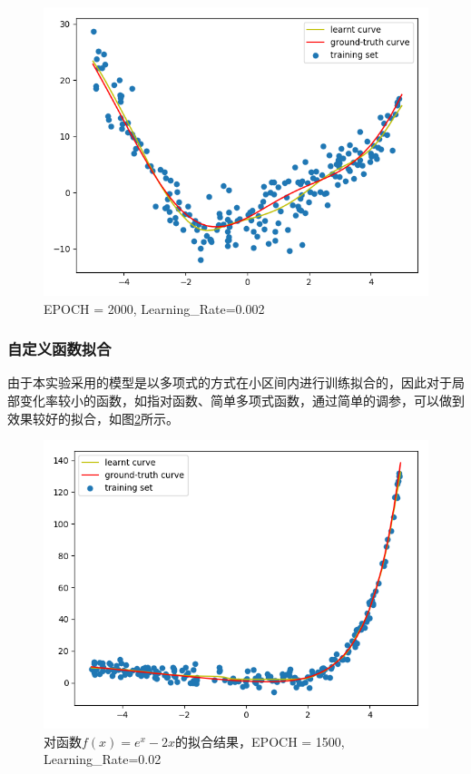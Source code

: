 \documentclass{article}
\begin{document}
\begin{figure}[htb]
\centering
\includegraphics[width=13.5cm]{img/plot2000_002.png}
\caption{EPOCH = 2000, Learning\_Rate=0.002}
\label{fig:funB2}
\end{figure}


\subsubsection{自定义函数拟合}

由于本实验采用的模型是以多项式的方式在小区间内进行训练拟合的，因此对于局部变化率较小的函数，如指对函数、简单多项式函数，通过简单的调参，可以做到效果较好的拟合，如图\ref{fig:funC1}所示。

\begin{figure}[htb]
\centering
\includegraphics[width=13.5cm]{img/good.png}
\caption{对函数$f(x)=e^x - 2x$的拟合结果，EPOCH = 1500, Learning\_Rate=0.02}
\label{fig:funC1}
\end{figure}
\end{document}
